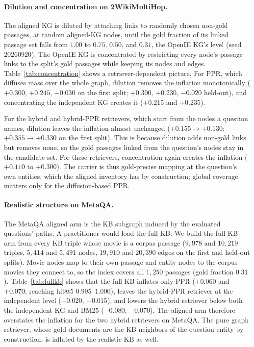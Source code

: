 \documentclass[11pt]{article}
\begin{document}
\paragraph{Dilution and concentration on 2WikiMultiHop.} The aligned KG is diluted by attaching links to randomly chosen non-gold passages, at random aligned-KG nodes, until the gold fraction of its linked passage set falls from $1.00$ to $0.75$, $0.50$, and $0.31$, the OpenIE KG's level (seed $20260920$). The OpenIE KG is concentrated by restricting every node's passage links to the split's gold passages while keeping its nodes and edges. Table~\ref{tab:concentration} shows a retriever-dependent picture. For PPR, which diffuses mass over the whole graph, dilution removes the inflation monotonically ($+0.300$, $+0.245$, $-0.030$ on the first split; $+0.300$, $+0.230$, $-0.020$ held-out), and concentrating the independent KG creates it ($+0.215$ and $+0.235$).

For the hybrid and hybrid-PPR retrievers, which start from the nodes a question names, dilution leaves the inflation almost unchanged ($+0.155\to+0.130$; $+0.355\to+0.330$ on the first split). This is because dilution adds non-gold links but removes none, so the gold passages linked from the question's nodes stay in the candidate set. For these retrievers, concentration again creates the inflation ($+0.110$ to $+0.300$). The carrier is thus gold-precise mapping at the question's own entities, which the aligned inventory has by construction; global coverage matters only for the diffusion-based PPR.

\paragraph{Realistic structure on MetaQA.} The MetaQA aligned arm is the KB subgraph induced by the evaluated questions' paths. A practitioner would load the full KB. We build the full-KB arm from every KB triple whose movie is a corpus passage ($9{,}978$ and $10{,}219$ triples, $5{,}414$ and $5{,}491$ nodes, $19{,}910$ and $20{,}390$ edges on the first and held-out splits). Movie nodes map to their own passage and entity nodes to the corpus movies they connect to, so the index covers all $1{,}250$ passages (gold fraction $0.31$). Table~\ref{tab:fullkb} shows that the full KB inflates only PPR ($+0.060$ and $+0.070$, reaching hit@5 $0.995$--$1.000$), leaves the hybrid-PPR retriever at the independent level ($-0.020$, $-0.015$), and lowers the hybrid retriever below both the independent KG and BM25 ($-0.080$, $-0.070$). The aligned arm therefore overstates the inflation for the two hybrid retrievers on MetaQA. The pure graph retriever, whose gold documents are the KB neighbors of the question entity by construction, is inflated by the realistic KB as well.
\end{document}
